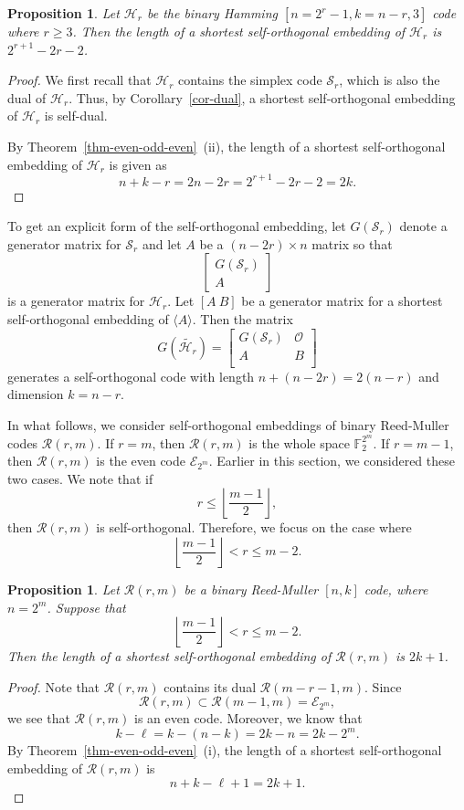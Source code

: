 \documentclass{article}
\newtheorem{prop}[theorem]{Proposition}
\theoremstyle{definition}
\theoremstyle{remark}
\begin{document}
\begin{prop}
Let $\mathcal{H}_r$ be the binary Hamming $[n=2^r-1, k=n-r, 3]$ code where $r \ge 3$. Then the length of a shortest self-orthogonal embedding of $\mathcal{H}_r$ is $2^{r+1}-2r-2$.
\end{prop}
\begin{proof}
We first recall that $\mathcal H_r$ contains the simplex code $\mathcal S_r$, which is also the dual of  $\mathcal H_r$. Thus, by Corollary~\ref{cor-dual}, a shortest self-orthogonal embedding of $\mathcal{H}_r$ is self-dual.

By Theorem~\ref{thm-even-odd-even}~(ii), the length of a shortest self-orthogonal embedding of $\mathcal{H}_r$ is given as
\[
n+k-r=2n-2r=2^{r+1}-2r-2=2k.
\]
\end{proof}
To get an explicit form of the self-orthogonal embedding, let $G(\mathcal S_r)$ denote a generator matrix for $\mathcal S_r$ and let $A$ be a $(n-2r) \times n$ matrix so that
\[
\begin{bmatrix}
G(\mathcal S_r) \\ A
\end{bmatrix}
\]
is a generator matrix for $\mathcal{H}_r$.  Let $[A ~ B]$ be a generator matrix for a shortest self-orthogonal embedding of $\langle A\rangle$.  Then the matrix
\[
G(\tilde{\mathcal H_r}) = \begin{bmatrix}
G(\mathcal S_r) & \mathcal{O} \\
A  & B \\
\end{bmatrix}
\]
generates a self-orthogonal code with length $n+ (n-2r)=2(n-r)$ and dimension $k=n-r$.

In what follows, we consider self-orthogonal embeddings of binary Reed-Muller codes $\mathcal R(r, m)$. If $r=m$, then $\mathcal R(r, m)$ is the whole space $\mathbb F_2^{2^m}$. If $r=m-1$, then $\mathcal R(r, m)$ is the even code $\mathcal E_{2^m}$. Earlier in this section, we considered these two cases. We note that if
\[
r \le \left\lfloor \frac{m-1}{2} \right\rfloor,
\]
then $\mathcal R(r, m)$ is self-orthogonal.  Therefore, we focus on the case where
\[
\left\lfloor \frac{m-1}{2} \right\rfloor < r \le  m-2.
\]

\begin{prop}
Let $\mathcal R(r, m)$ be a binary Reed-Muller $[n, k]$ code, where $n=2^m$. Suppose that
\[
\left\lfloor \frac{m-1}{2} \right\rfloor < r \le  m-2.
\]
Then the length of a shortest self-orthogonal embedding of $\mathcal R(r, m)$ is $2k+1$.
\end{prop}
\begin{proof}
Note that $\mathcal R(r, m)$ contains its dual $\mathcal R(m-r-1, m)$. Since
\[
\mathcal R(r, m) \subset \mathcal R(m-1, m)=\mathcal E_{2^m},
\]
we see that $\mathcal R(r, m)$ is an even code. Moreover, we know that
\[
k - \ell = k-(n-k) = 2k -n =2k -2^m.
\]
By Theorem~\ref{thm-even-odd-even}~(i), the length of a shortest self-orthogonal embedding of $\mathcal R(r, m)$ is
\[
n+k-\ell+1=2k+1.
\]
\end{proof}
\end{document}
